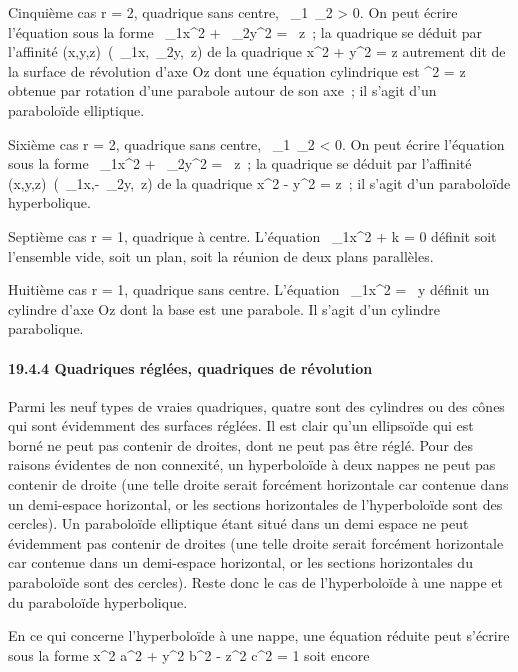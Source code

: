\documentclass[]{article}
\begin{document}
Cinquième cas r = 2, quadrique sans centre, \lambda~\_1\lambda~\_2
\textgreater{} 0. On peut écrire l'équation sous la forme
\lambda~\_1x^2 + \lambda~\_2y^2 = \beta~z~; la
quadrique se déduit par l'affinité
(x,y,z)\mapsto~(\sqrt\lambda~\_1x,\sqrt\lambda~\_2y,\beta~z)
de la quadrique x^2 + y^2 = z autrement dit de la
surface de révolution d'axe Oz dont une équation cylindrique est
\rho^2 = z obtenue par rotation d'une parabole autour de son
axe~; il s'agit d'un paraboloïde elliptique.

Sixième cas r = 2, quadrique sans centre, \lambda~\_1\lambda~\_2
\textless{} 0. On peut écrire l'équation sous la forme
\lambda~\_1x^2 + \lambda~\_2y^2 = \beta~z~; la
quadrique se déduit par l'affinité
(x,y,z)\mapsto~(\sqrt\lambda~\_1x,\sqrt-\lambda~\_2y,\beta~z)
de la quadrique x^2 - y^2 = z~; il s'agit d'un
paraboloïde hyperbolique.

Septième cas r = 1, quadrique à centre. L'équation
\lambda~\_1x^2 + k = 0 définit soit l'ensemble vide, soit un
plan, soit la réunion de deux plans parallèles.

Huitième cas r = 1, quadrique sans centre. L'équation
\lambda~\_1x^2 = \beta~y définit un cylindre d'axe Oz dont la
base est une parabole. Il s'agit d'un cylindre parabolique.

\paragraph{19.4.4 Quadriques réglées, quadriques de révolution}

Parmi les neuf types de vraies quadriques, quatre sont des cylindres ou
des cônes qui sont évidemment des surfaces réglées. Il est clair qu'un
ellipsoïde qui est borné ne peut pas contenir de droites, dont ne peut
pas être réglé. Pour des raisons évidentes de non connexité, un
hyperboloïde à deux nappes ne peut pas contenir de droite (une telle
droite serait forcément horizontale car contenue dans un demi-espace
horizontal, or les sections horizontales de l'hyperboloïde sont des
cercles). Un paraboloïde elliptique étant situé dans un demi espace ne
peut évidemment pas contenir de droites (une telle droite serait
forcément horizontale car contenue dans un demi-espace horizontal, or
les sections horizontales du paraboloïde sont des cercles). Reste donc
le cas de l'hyperboloïde à une nappe et du paraboloïde hyperbolique.

En ce qui concerne l'hyperboloïde à une nappe, une équation réduite peut
s'écrire sous la forme  x^2 \over
a^2 + y^2 \over
b^2 - z^2 \over
c^2 = 1 soit encore
\end{document}
